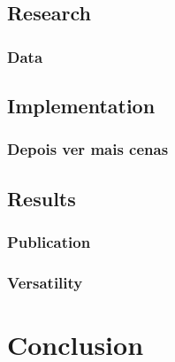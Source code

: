 \documentclass[11pt,a4paper]{report}
\begin{document}
\section{Research}
\subsection{Data}
\section{Implementation}
\subsection{Depois ver mais cenas}
\section{Results}
\subsection{Publication}
\subsection{Versatility}

\chapter{Conclusion}









\end{document}
